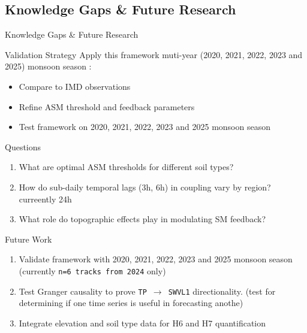\subsection{Knowledge Gaps \& Future Research}
\begin{frame}{Knowledge Gaps \& Future Research}
	\vspace{-0.1cm}
	\begin{block}{Validation Strategy}
		\footnotesize
		Apply this framework muti-year (2020, 2021, 2022, 2023 and 2025) monsoon season :
		\begin{itemize}
			\item Compare to IMD observations
			\item Refine ASM threshold and feedback parameters
			\item Test framework on 2020, 2021, 2022, 2023 and 2025 monsoon season
		\end{itemize}
	\end{block}

	\begin{block}{Questions}
		\footnotesize
		\begin{enumerate}
			\item What are optimal ASM thresholds for different soil types?
			\item How do sub-daily temporal lags (3h, 6h) in coupling vary by region? curreently 24h
			\item What role do topographic effects play in modulating SM feedback?
		\end{enumerate}
	\end{block}

	\begin{block}{\small Future Work}
		\footnotesize
		\begin{enumerate}
			\item Validate framework with 2020, 2021, 2022, 2023 and 2025 monsoon season (currently \texttt{n=6 tracks from 2024} only)
			\item Test Granger causality to prove \texttt{TP $\rightarrow$ SWVL1} directionality. (\tiny test for determining if one time series is useful in forecasting anothe)\footnotesize
			\item Integrate elevation and soil type data for H6 and H7 quantification
		\end{enumerate}
	\end{block}


\end{frame}
